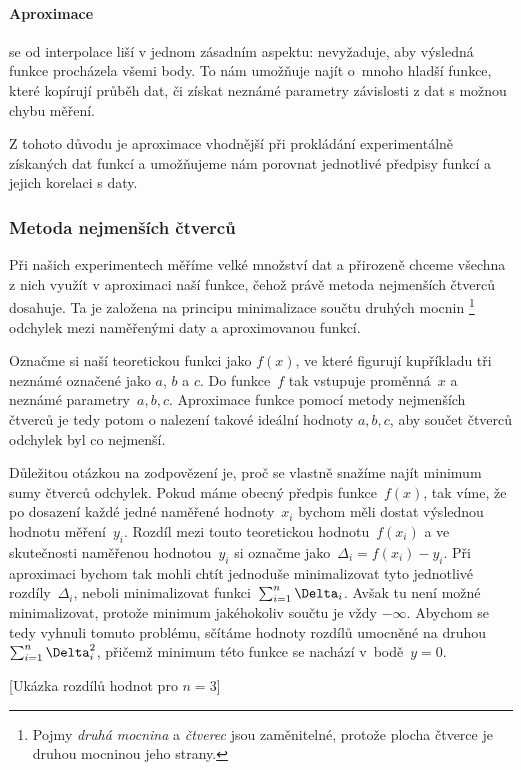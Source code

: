\paragraph{Aproximace} se od interpolace liší v jednom zásadním aspektu:
nevyžaduje, aby výsledná funkce procházela všemi body. To nám umožňuje najít
o~mnoho hladší funkce, které kopírují průběh dat, či získat neznámé parametry
závislosti z dat s možnou chybu měření. 

Z tohoto důvodu je aproximace vhodnější při prokládání experimentálně získaných
dat funkcí a umožňujeme nám porovnat jednotlivé předpisy funkcí a jejich
korelaci s daty.

\subsubsection{Metoda nejmenších čtverců}
\label{sec:čtverce}
Při našich experimentech měříme velké množství dat a přirozeně chceme všechna
z nich využít v aproximaci naší funkce, čehož právě metoda nejmenších čtverců
dosahuje. Ta je založena na principu minimalizace součtu druhých mocnin%
\footnote{Pojmy \emph{druhá mocnina} a \emph{čtverec} jsou zaměnitelné, protože
plocha čtverce je druhou mocninou jeho strany.} odchylek mezi naměřenými daty a
aproximovanou funkcí.

Označme si naší teoretickou funkci jako $f(x)$, ve které figurují kupříkladu
tři neznámé označené jako $a$, $b$ a $c$. Do funkce~$f$ tak vstupuje
proměnná~$x$ a neznámé parametry~$a,b,c$. Aproximace funkce pomocí metody
nejmenších čtverců je tedy potom o nalezení takové ideální hodnoty $a,b,c$, aby
součet čtverců odchylek byl co nejmenší.

Důležitou otázkou na zodpovězení je, proč se vlastně snažíme najít minimum sumy
čtverců odchylek. Pokud máme obecný předpis funkce~$f(x)$, tak víme, že po
dosazení každé jedné naměřené hodnoty~$x_i$ bychom měli dostat výslednou
hodnotu měření~$y_i$. Rozdíl mezi touto teoretickou hodnotu~$f(x_i)$ a ve
skutečnosti naměřenou hodnotou~$y_i$ si označme jako~$\Delta_i = f(x_i)-y_i$.
Při aproximaci bychom tak mohli chtít jednoduše minimalizovat tyto jednotlivé
rozdíly~$\Delta_i$, neboli minimalizovat funkci~$\nsum \Delta_i$. Avšak tu není
možné minimalizovat, protože minimum jakéhokoliv součtu je vždy $-\infty$.
Abychom se tedy vyhnuli tomuto problému, sčítáme hodnoty rozdílů umocněné na
druhou~$\nsum \Delta_i^2$, přičemž minimum této funkce se nachází
v~bodě~$y=0$.~\cite{praktikum}

[Ukázka rozdílů hodnot pro $n=3$]

